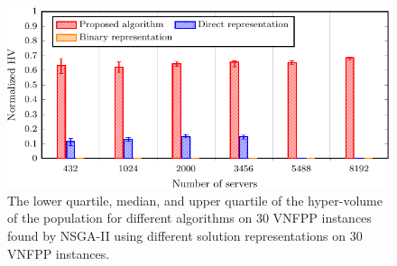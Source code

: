 \begin{figure}[t!]
    \centering
    \includegraphics[width=\linewidth]{graphs/solution_representation/comparison-crop}
    \caption{The lower quartile, median, and upper quartile of the hyper-volume of the population for different algorithms on 30 VNFPP instances found by NSGA-II using different solution representations on 30 VNFPP instances.}
    \label{fig:solution_representation_comparison}
\end{figure}
